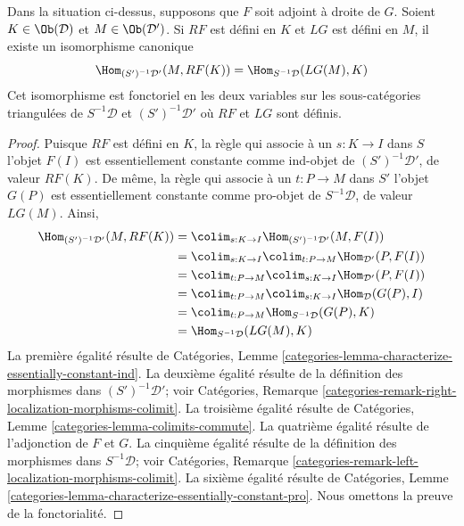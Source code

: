 \begin{lemma}
\label{lemma-pre-derived-adjoint-functors-general}
Dans la situation ci-dessus, supposons que $F$ soit adjoint à droite de $G$.
Soient $K \in \Ob(\mathcal{D})$ et $M \in \Ob(\mathcal{D}')$.
Si $RF$ est défini en $K$ et $LG$ est défini en $M$, il existe un
isomorphisme canonique
$$
\Hom_{(S')^{-1}\mathcal{D}'}(M, RF(K)) =
\Hom_{S^{-1}\mathcal{D}}(LG(M), K)
$$
Cet isomorphisme est fonctoriel en les deux variables sur les sous-catégories
triangulées de $S^{-1}\mathcal{D}$ et $(S')^{-1}\mathcal{D}'$ où $RF$ et
$LG$ sont définis.
\end{lemma}

\begin{proof}
Puisque $RF$ est défini en $K$, la règle qui associe à un
$s : K \to I$ dans $S$ l'objet $F(I)$ est essentiellement constante comme
ind-objet de $(S')^{-1}\mathcal{D}'$, de valeur $RF(K)$.
De même, la règle qui associe à un $t : P \to M$ dans $S'$ l'objet $G(P)$ est
essentiellement constante comme pro-objet de $S^{-1}\mathcal{D}$, de valeur
$LG(M)$. Ainsi,
\begin{align*}
\Hom_{(S')^{-1}\mathcal{D}'}(M, RF(K))
& =
\colim_{s : K \to I} \Hom_{(S')^{-1}\mathcal{D}'}(M, F(I)) \\
& =
\colim_{s : K \to I} \colim_{t : P \to M} \Hom_{\mathcal{D}'}(P, F(I)) \\
& =
\colim_{t : P \to M} \colim_{s : K \to I} \Hom_{\mathcal{D}'}(P, F(I)) \\
& =
\colim_{t : P \to M} \colim_{s : K \to I} \Hom_{\mathcal{D}}(G(P), I) \\
& =
\colim_{t : P \to M} \Hom_{S^{-1}\mathcal{D}}(G(P), K) \\
& =
\Hom_{S^{-1}\mathcal{D}}(LG(M), K)
\end{align*}
La première égalité résulte de
Catégories, Lemme \ref{categories-lemma-characterize-essentially-constant-ind}.
La deuxième égalité résulte de la définition des morphismes dans
$(S')^{-1}\mathcal{D}'$; voir Catégories, Remarque
\ref{categories-remark-right-localization-morphisms-colimit}.
La troisième égalité résulte de
Catégories, Lemme \ref{categories-lemma-colimits-commute}.
La quatrième égalité résulte de l'adjonction de $F$ et $G$.
La cinquième égalité résulte de la définition des morphismes dans
$S^{-1}\mathcal{D}$; voir Catégories, Remarque
\ref{categories-remark-left-localization-morphisms-colimit}.
La sixième égalité résulte de
Catégories, Lemme \ref{categories-lemma-characterize-essentially-constant-pro}.
Nous omettons la preuve de la fonctorialité.
\end{proof}

